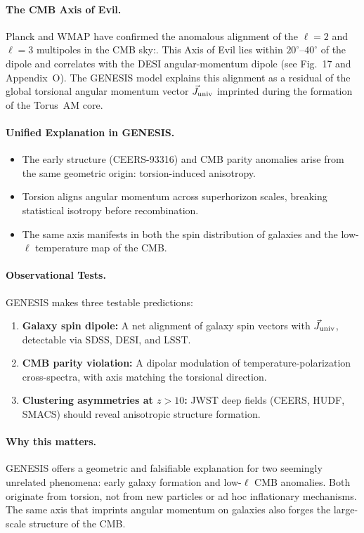 \documentclass{article}
\begin{document}
\paragraph{The CMB Axis of Evil.}
Planck and WMAP have confirmed the anomalous alignment of the $\ell = 2$ and $\ell = 3$ multipoles in the CMB sky:\cite{Planck2018Isotropy, Copi2015, WMAP9yearAnomalies}. This Axis of Evil lies within $20^\circ$–$40^\circ$ of the dipole and correlates with the DESI angular-momentum dipole (see Fig.~17 and Appendix~O). The GENESIS model explains this alignment as a residual of the global torsional angular momentum vector $\vec{J}_{\rm univ}$ imprinted during the formation of the Torus~AM core.

\paragraph{Unified Explanation in GENESIS.}
\begin{itemize}
    \item The early structure (CEERS-93316) and CMB parity anomalies arise from the same geometric origin: torsion-induced anisotropy.
    \item Torsion aligns angular momentum across superhorizon scales, breaking statistical isotropy before recombination.
    \item The same axis manifests in both the spin distribution of galaxies and the low-$\ell$ temperature map of the CMB.
\end{itemize}

\paragraph{Observational Tests.}
GENESIS makes three testable predictions:
\begin{enumerate}
    \item \textbf{Galaxy spin dipole:} A net alignment of galaxy spin vectors with $\vec{J}_{\rm univ}$, detectable via SDSS, DESI, and LSST.
    \item \textbf{CMB parity violation:} A dipolar modulation of temperature-polarization cross-spectra, with axis matching the torsional direction.
    \item \textbf{Clustering asymmetries at $z > 10$:} JWST deep fields (CEERS, HUDF, SMACS) should reveal anisotropic structure formation.
\end{enumerate}

\paragraph{Why this matters.}
GENESIS offers a geometric and falsifiable explanation for two seemingly unrelated phenomena: early galaxy formation and low-$\ell$ CMB anomalies. Both originate from torsion, not from new particles or ad hoc inflationary mechanisms. The same axis that imprints angular momentum on galaxies also forges the large-scale structure of the CMB.
\end{document}
